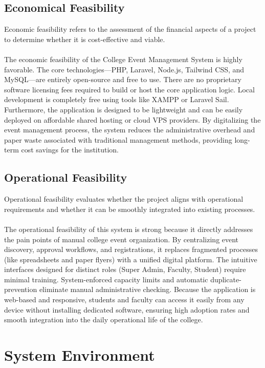  \subsection{Economical Feasibility}
 Economic feasibility refers to the assessment of the financial aspects of a project to determine whether it is cost-effective and viable.\\\\
 The economic feasibility of the College Event Management System is highly favorable. The core technologies—PHP, Laravel, Node.js, Tailwind CSS, and MySQL—are entirely open-source and free to use. There are no proprietary software licensing fees required to build or host the core application logic. Local development is completely free using tools like XAMPP or Laravel Sail. Furthermore, the application is designed to be lightweight and can be easily deployed on affordable shared hosting or cloud VPS providers. By digitalizing the event management process, the system reduces the administrative overhead and paper waste associated with traditional management methods, providing long-term cost savings for the institution.
 
 \subsection{Operational Feasibility}
 Operational feasibility evaluates whether the project aligns with operational requirements and whether it can be smoothly integrated into existing processes.\\\\
 The operational feasibility of this system is strong because it directly addresses the pain points of manual college event organization. By centralizing event discovery, approval workflows, and registrations, it replaces fragmented processes (like spreadsheets and paper flyers) with a unified digital platform. The intuitive interfaces designed for distinct roles (Super Admin, Faculty, Student) require minimal training. System-enforced capacity limits and automatic duplicate-prevention eliminate manual administrative checking. Because the application is web-based and responsive, students and faculty can access it easily from any device without installing dedicated software, ensuring high adoption rates and smooth integration into the daily operational life of the college.

 \section{System Environment}
 
